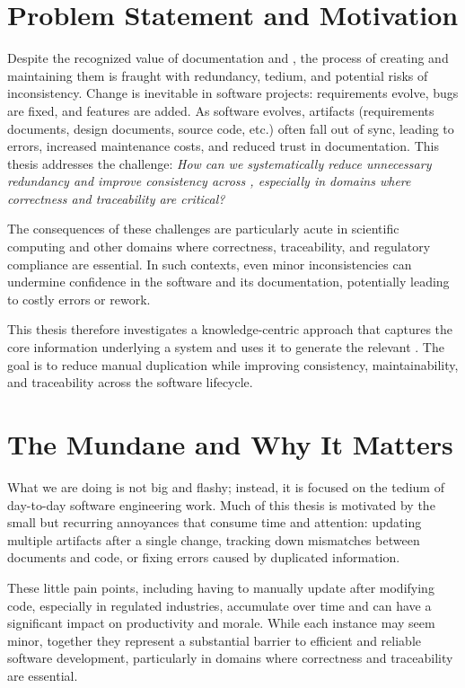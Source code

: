 \section{Problem Statement and Motivation}
Despite the recognized value of documentation and \sfs{}, 
the process of creating and maintaining them is fraught with redundancy, 
tedium, and potential risks of inconsistency. Change is inevitable in software 
projects: requirements evolve, bugs are fixed, and features are added. As 
software evolves, artifacts (requirements documents, design documents, source 
code, etc.) often fall out of sync, leading to errors, increased maintenance 
costs, and reduced trust in documentation. This thesis addresses the challenge: 
\emph{How can we systematically reduce unnecessary redundancy and improve 
consistency across \sfs{}, especially in domains where correctness 
and traceability are critical?}

The consequences of these challenges are particularly acute in scientific
computing and other domains where correctness, traceability, and regulatory
compliance are essential. In such contexts, even minor inconsistencies can
undermine confidence in the software and its documentation, potentially
leading to costly errors or rework.

This thesis therefore investigates a knowledge-centric approach that captures
the core information underlying a system and uses it to generate the relevant
\sfs{}. The goal is to reduce manual duplication while improving consistency,
maintainability, and traceability across the software lifecycle.

\section{The Mundane and Why It Matters}

What we are doing is not big and flashy; instead, it is focused on the tedium
of day-to-day software engineering work. Much of this thesis is motivated by
the small but recurring annoyances that consume time and attention: updating
multiple artifacts after a single change, tracking down mismatches between
documents and code, or fixing errors caused by duplicated information.

These little pain points, including having to manually update \sfs{} after
modifying code, especially in regulated industries, accumulate over time and
can have a significant impact on productivity and morale. While each instance
may seem minor, together they represent a substantial barrier to efficient and
reliable software development, particularly in domains where correctness and
traceability are essential.

